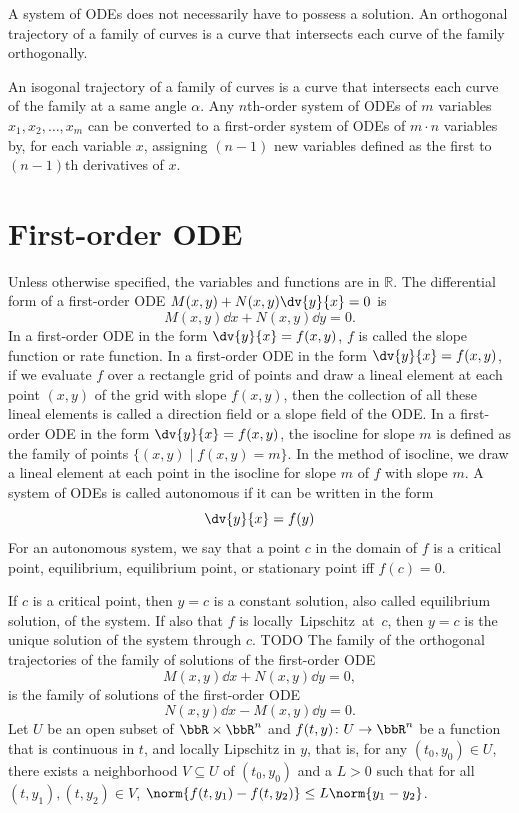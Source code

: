\documentclass[a4paper,12pt]{report}
\begin{document}
A system of ODEs does not necessarily have to possess a solution.
An orthogonal trajectory of a family of curves is a curve that intersects each curve of the family orthogonally.

An isogonal trajectory of a family of curves is a curve that intersects each curve of the family at a same angle $\alpha$.
Any $n$th-order system of ODEs of $m$ variables $x_1,x_2,\ldots,x_m$ can be converted to a first-order system of ODEs of $m\cdot n$ variables by, for each variable $x$, assigning $(n-1)$ new variables defined as the first to $(n-1)$th derivatives of $x$.
\section{First-order ODE}
Unless otherwise specified, the variables and functions are in $\mathbb{R}$.
The differential form of a first-order ODE $M(x,y)+N(x,y)\dv{y}{x}=0$ is
\[M(x,y)\dd{x}+N(x,y)\dd{y}=0.\]
In a first-order ODE in the form $\dv{y}{x}=f(x,y)$, $f$ is called the slope function or rate function.
In a first-order ODE in the form $\dv{y}{x}=f(x,y)$, if we evaluate $f$ over a rectangle grid of points and draw a lineal element at each point $(x,y)$ of the grid with slope $f(x,y)$, then the collection of all these lineal elements is called a direction field or a slope field of the ODE.
In a first-order ODE in the form $\dv{y}{x}=f(x,y)$, the isocline for slope $m$ is defined as the family of points $\{(x,y)\mid f(x,y)=m\}$. In the method of isocline, we draw a lineal element at each point in the isocline for slope $m$ of $f$ with slope $m$.
A system of ODEs is called autonomous if it can be written in the form
\[\dv{y}{x}=f(y)\]
For an autonomous system, we say that a point $c$ in the domain of $f$ is a critical point, equilibrium, equilibrium point, or stationary point iff $f(c)=0$.

If $c$ is a critical point, then $y=c$ is a constant solution, also called equilibrium solution, of the system. If also that $f$ is locally Lipschitz at $c$, then $y=c$ is the unique solution of the system through $c$.
TODO
The family of the orthogonal trajectories of the family of solutions of the first-order ODE
\[M(x,y)\dd{x}+N(x,y)\dd{y}=0,\]
is the family of solutions of the first-order ODE
\[N(x,y)\dd{x}-M(x,y)\dd{y}=0.\]
Let $U$ be an open subset of $\bbR\times\bbR^n$ and $f(t,y)\colon U\to\bbR^n$ be a function that is continuous in $t$, and locally Lipschitz in $y$, that is, for any $(t_0,y_0)\in U$, there exists a neighborhood $V\subseteq U$ of $(t_0,y_0)$ and a $L>0$ such that for all $(t,y_1),(t,y_2)\in V$, $\norm{f(t,y_1)-f(t,y_2)}\le L\norm{y_1-y_2}$.
\end{document}
